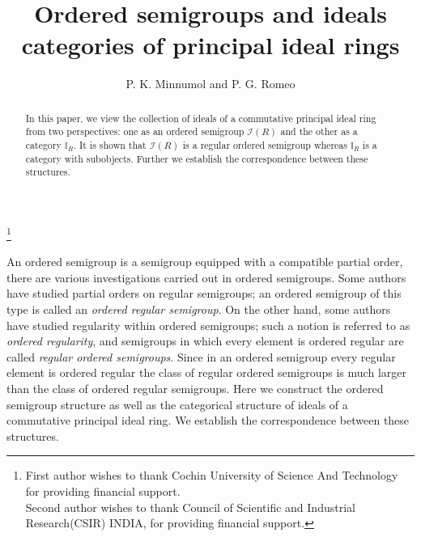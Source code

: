 \documentclass[12pt,a4paper]{amsart}
\theoremstyle{plain}
\theoremstyle{definition}
\begin{document}
	
	\title[Ordered Semigroups and categories of ideals]{Ordered semigroups and ideals categories of  principal ideal rings}
	
			\author[ P. K. Minnumol and P. G. Romeo]{P. K. Minnumol and P. G. Romeo}
			
	\address{Department of Mathematics\\
		Cochin University of Science and Technology(CUSAT)\\Kochi, Kerala, India, 682022}
	
	\thanks{First author wishes to thank Cochin University of Science And Technology for providing financial support.\\
		Second author wishes to thank Council of Scientific and Industrial Research(CSIR) INDIA, for providing financial support.
		 }

\begin{abstract}
	In this paper, we view the collection of ideals of a commutative principal ideal ring from two perspectives: one as an ordered semigroup $\mathcal{I}(R)$ and the other as a category $\mathbb{I}_R$. It is shown that $\mathcal{I}(R)$ is a regular ordered semigroup whereas $\mathbb{I}_R$ is a category with subobjects. Further we establish the correspondence between these structures.
\end{abstract}
\maketitle
An ordered semigroup is a semigroup equipped with a compatible partial order, there are various investigations carried out in ordered semigroups. 
Some authors have studied partial orders on regular semigroups; an ordered semigroup of this type is called an \emph{ordered regular semigroup}. 
On the other hand, some authors have studied regularity within ordered semigroups; such a notion is referred to as \emph{ordered regularity}, and semigroups in which every element is ordered regular are called \emph{regular ordered semigroups}. 
Since in an ordered semigroup every regular element is ordered regular the class of regular ordered semigroups is much larger than the class of ordered regular semigroups. 
Here we construct the ordered semigroup structure as well as the categorical structure of ideals of a commutative principal ideal ring.  We establish the correspondence between these structures.
\end{document}
